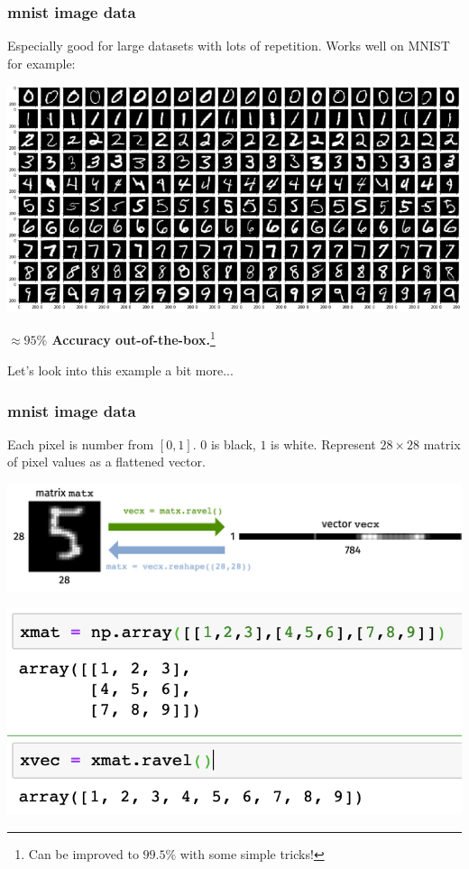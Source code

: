 \documentclass[handout,compress]{beamer}
\begin{document}
\begin{frame}
	\frametitle{mnist image data}
	Especially good for large datasets with lots of repetition. Works well on MNIST for example:
	\begin{center}
		\includegraphics[width=.6\textwidth]{mnist.png}
		
		\textbf{\alert{$\approx 95\%$ Accuracy out-of-the-box.}}\footnote{Can be improved to $99.5\%$ with some simple tricks!}
	\end{center}


	Let's look into this example a bit more...
	\vspace{3em}
\end{frame}

\begin{frame}
	\frametitle{mnist image data}
	Each pixel is number from $[0,1]$. $0$ is black, $1$ is white. 
	Represent $28\times 28$ matrix of pixel values as a flattened vector.
	\begin{center}
		\includegraphics[width=\textwidth]{flatten.png}
		
		\includegraphics[width=.7\textwidth]{flatten_code.png}
	\end{center}
\end{frame}
\end{document}
